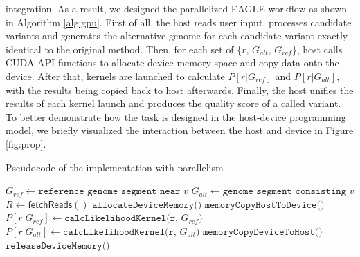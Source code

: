 \documentclass{PHlab-thesis}
\begin{document}
integration. As a result, we designed the parallelized EAGLE workflow as shown in Algorithm \ref{alg:gpu}. First of all, the host reads user input, processes candidate variants and generates the alternative genome for each candidate variant exactly identical to the original method. Then, for each set of \{$r$, $G_{alt}$, $G_{ref}$\}, host calls CUDA API functions to allocate device memory space and copy data onto the device. After that, kernels are launched to calculate $P[r|G_{ref}]$ and $P[r|G_{alt}]$, with the results being copied back to host afterwards. Finally, the host unifies the results of each kernel launch and produces the quality score of a called variant. To better demonstrate how the task is designed in the host-device programming model, we briefly visualized the interaction between the host and device in Figure \ref{fig:prop}. 
\begin{algorithm}
	\caption{Pseudocode of the implementation with parallelism}
	\label{alg:gpu}
	\begin{algorithmic}
		\State $G_{ref} \gets \texttt{reference genome segment near } v$
		\State $G_{alt} \gets \texttt{genome segment consisting } v$
		\State $R \gets \mathsf{fetchReads}()$ 
			\State $\texttt{allocateDeviceMemory()}$
			\State $\texttt{memoryCopyHostToDevice()}$
			\State $P[r|G_{ref}] \gets \texttt{calcLikelihoodKernel(r, $G_{ref}$)}$
			\State $P[r|G_{alt}] \gets \texttt{calcLikelihoodKernel(r, $G_{alt}$)}$
			\State $\texttt{memoryCopyDeviceToHost()}$
			\State $\texttt{releaseDeviceMemory()}$
		\EndFor
	\EndFor
	\end{algorithmic}
\end{algorithm}
\end{document}
